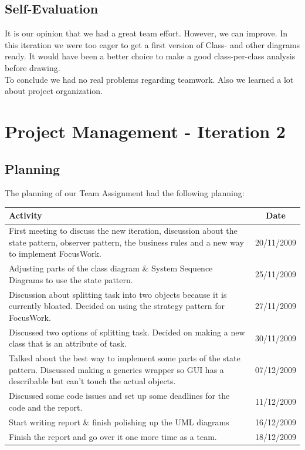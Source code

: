 		\subsection{Self-Evaluation}
		It is our opinion that we had a great team effort. However, we can improve. In this iteration we were too eager to get a first version of Class- and other diagrams ready. It would have been a better choice to make a good class-per-class analysis before drawing.\\
		To conclude we had no real problems regarding teamwork. Also we learned a lot about project organization.
	\section{Project Management - Iteration 2}
		\subsection{Planning}
		The planning of our Team Assignment had the following planning:\\
	
		\begin{tabular}{p{300 pt}|c}
		Activity & Date\\
		\hline
		First meeting to discuss the new iteration, discussion about the state pattern, observer pattern, the business rules and a new way to implement FocusWork. & 20/11/2009\\ \hline
		Adjusting parts of the class diagram \& System Sequence Diagrams to use the state pattern. & 25/11/2009\\ \hline
		Discussion about splitting task into two objects because it is currently bloated. Decided on using the strategy pattern for FocusWork. & 27/11/2009\\ \hline
		Discussed two options of splitting task. Decided on making a new class that is an attribute of task. & 30/11/2009\\ \hline
		Talked about the best way to implement some parts of the state pattern. Discussed making a generics wrapper so GUI has a describable but can't touch the actual objects. & 07/12/2009\\ \hline
		Discussed some code issues and set up some deadlines for the code and the report. & 11/12/2009\\ \hline
		Start writing report \& finish polishing up the UML diagrams & 16/12/2009\\ \hline
		Finish the report and go over it one more time as a team. & 18/12/2009\\ \hline
		\end{tabular}
		
